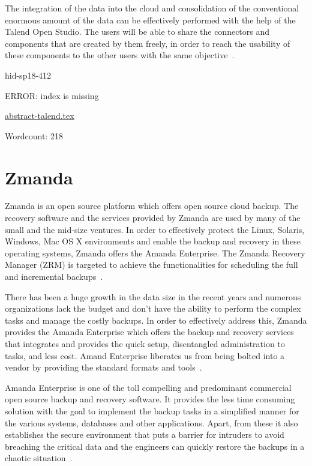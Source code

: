 The integration of the data into the cloud and consolidation of the
conventional enormous amount of the data can be effectively performed
with the help of the Talend Open Studio. The users will be able to share
the connectors and components that are created by them freely,
in order to reach the usability of these components to the
other users with the same objective~\cite{hid-sp18-412-talend_products}.




\begin{IU}

hid-sp18-412

ERROR: index is missing

\href{https://github.com/cloudmesh-community/hid-sp18-412/blob/master//technology/abstract-talend.tex}{abstract-talend.tex}

 

Wordcount: 218

\end{IU}

\section{Zmanda}
Zmanda is an open source platform which offers open source cloud
backup.  The recovery software and the services provided by Zmanda are
used by many of the small and the mid-size ventures. In order to
effectively protect the Linux, Solaris, Windows, Mac OS X environments
and enable the backup and recovery in these operating systems, Zmanda
offers the Amanda Enterprise. The Zmanda Recovery Manager (ZRM) is
targeted to achieve the functionalities for scheduling the full and
incremental backups~\cite{hid-sp18-412-zmanda_crunchbase}.

There has been a huge growth in the data size in the recent years and
numerous organizations lack the budget and don't have the ability to
perform the complex tasks and manage the costly backups. In order to
effectively address this, Zmanda provides the Amanda Enterprise which
offers the backup and recovery services that integrates and provides
the quick setup, disentangled administration to tasks, and less
cost. Amand Enterprise liberates us from being bolted into a vendor by
providing the standard formats and
tools~\cite{hid-sp18-412-zmanda_amanda}.


Amanda Enterprise is one of the toll compelling and predominant
commercial open source backup and recovery software. It provides the
less time consuming solution with the goal to implement the backup
tasks in a simplified manner for the various systems, databases and
other applications. Apart, from these it also establishes the secure
environment that puts a barrier for intruders to avoid breaching the
critical data and the engineers can quickly restore the backups in a
chaotic situation~\cite{hid-sp18-412-zmanda_webinar}.



